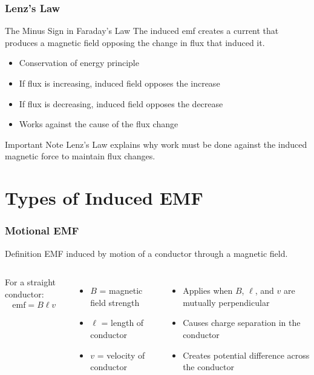 \documentclass{beamer}
\begin{document}
\begin{frame}
\frametitle{Lenz's Law}
\begin{block}{The Minus Sign in Faraday's Law}
The induced emf creates a current that produces a magnetic field opposing the change in flux that induced it.
\end{block}

\begin{itemize}
\item Conservation of energy principle
\item If flux is increasing, induced field opposes the increase
\item If flux is decreasing, induced field opposes the decrease
\item Works against the cause of the flux change
\end{itemize}

\begin{alertblock}{Important Note}
Lenz's Law explains why work must be done against the induced magnetic force to maintain flux changes.
\end{alertblock}


\end{frame}

\section{Types of Induced EMF}

\begin{frame}
\frametitle{Motional EMF}
\begin{block}{Definition}
EMF induced by motion of a conductor through a magnetic field.
\end{block}

\begin{columns}
For a straight conductor:
\begin{align}
\text{emf} = B\ell v
\end{align}

\begin{itemize}
\item $B$ = magnetic field strength
\item $\ell$ = length of conductor
\item $v$ = velocity of conductor
\end{itemize}

\begin{itemize}
\item Applies when $B$, $\ell$, and $v$ are mutually perpendicular
\item Causes charge separation in the conductor
\item Creates potential difference across the conductor
\end{itemize}
\end{columns}
\end{frame}
\end{document}
